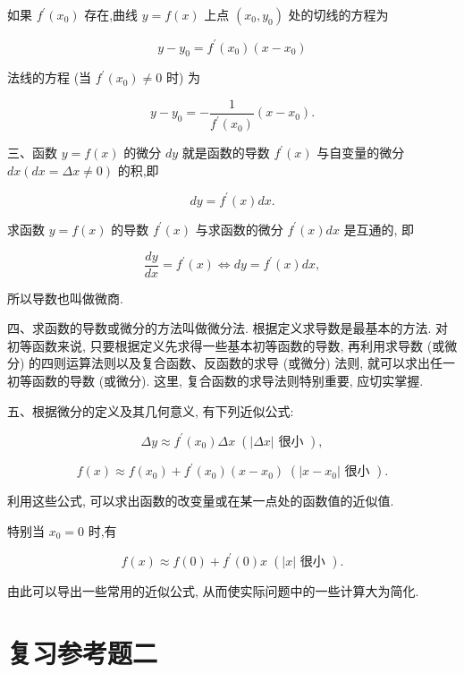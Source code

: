 \documentclass[lang=cn,newtx,10pt,scheme=chinese]{elegantbook}
\begin{document}
如果 \({f}^{\prime }\left( {x}_{0}\right)\) 存在,曲线 \(y = f\left( x\right)\) 上点 \(\left( {{x}_{0},{y}_{0}}\right)\) 处的切线的方程为

\[
y - {y}_{0} = {f}^{\prime }\left( {x}_{0}\right) \left( {x - {x}_{0}}\right)
\]

法线的方程 (当 \({f}^{\prime }\left( {x}_{0}\right) \neq 0\) 时) 为

\[
y - {y}_{0} = - \frac{1}{{f}^{\prime }\left( {x}_{0}\right) }\left( {x - {x}_{0}}\right) .
\]

三、函数 \(y = f\left( x\right)\) 的微分 \({dy}\) 就是函数的导数 \({f}^{\prime }\left( x\right)\) 与自变量的微分 \({dx}\left( {{dx} = {\Delta x} \neq 0}\right)\) 的积,即

\[
{dy} = {f}^{\prime }\left( x\right) {dx}.
\]

求函数 \(y = f\left( x\right)\) 的导数 \({f}^{\prime }\left( x\right)\) 与求函数的微分 \({f}^{\prime }\left( x\right) {dx}\) 是互通的, 即

\[
\frac{dy}{dx} = {f}^{\prime }\left( x\right) \Leftrightarrow {dy} = {f}^{\prime }\left( x\right) {dx},
\]

所以导数也叫做微商.

四、求函数的导数或微分的方法叫做微分法. 根据定义求导数是最基本的方法. 对初等函数来说, 只要根据定义先求得一些基本初等函数的导数, 再利用求导数 (或微分) 的四则运算法则以及复合函数、反函数的求导 (或微分) 法则, 就可以求出任一初等函数的导数 (或微分). 这里, 复合函数的求导法则特别重要, 应切实掌握.

五、根据微分的定义及其几何意义, 有下列近似公式:

\[
{\Delta y} \approx {f}^{\prime }\left( {x}_{0}\right) {\Delta x}\;\left( {\left| {\Delta x}\right| \text{ 很小 }}\right) ,
\]

\[
f\left( x\right) \approx f\left( {x}_{0}\right) + {f}^{\prime }\left( {x}_{0}\right) \left( {x - {x}_{0}}\right) \;\left( {\left| {x - {x}_{0}}\right| \text{ 很小 }}\right) .
\]

利用这些公式, 可以求出函数的改变量或在某一点处的函数值的近似值.

特别当 \({x}_{0} = 0\) 时,有

\[
f\left( x\right) \approx f\left( 0\right) + {f}^{\prime }\left( 0\right) x\;\left( {\left| x\right| \text{ 很小 }}\right) .
\]

由此可以导出一些常用的近似公式, 从而使实际问题中的一些计算大为简化.

\chapter*{复习参考题二}
\end{document}
